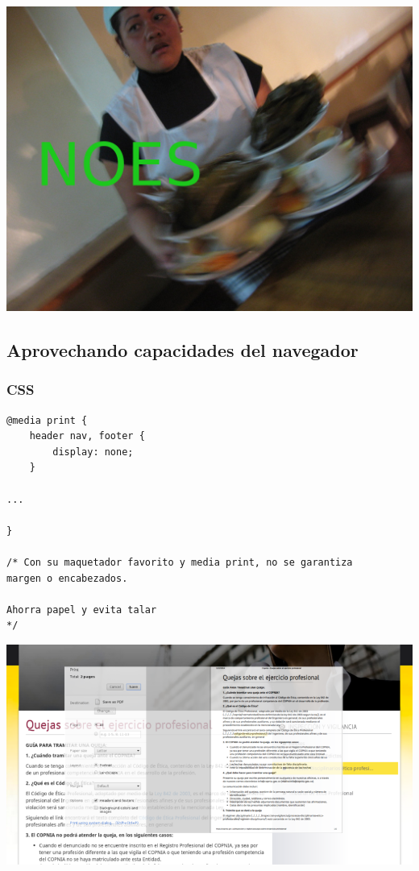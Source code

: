 \documentclass[8pt,xcolor={usenames,dvipsnames}]{beamer}
\begin{document}
\begin{frame}
\includegraphics[width=\paperwidth]{images/noestamal.jpg}

\end{frame}

\subsection{Aprovechando capacidades del navegador}

\begin{frame}[fragile]
\frametitle{CSS}
\begin{verbatim}
@media print {
    header nav, footer {
        display: none;
    }

...

}

/* Con su maquetador favorito y media print, no se garantiza
margen o encabezados.

Ahorra papel y evita talar
*/
\end{verbatim}
\end{frame}

\begin{frame}[fragile]
\includegraphics[width=\paperwidth]{images/cssmediaprint.png}

\end{frame}
\end{document}

